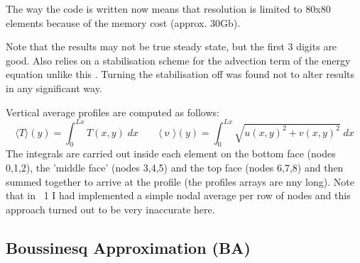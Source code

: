 The way the code is written now means that resolution is limited to 80x80 elements 
because of the memory cost (approx. 30Gb).

Note that the \aspect results may not be true steady state, but the first 3 digits are good.
Also \aspect relies on a stabilisation scheme for the advection term of the energy equation
unlike this \stone. Turning the stabilisation off was found not to alter results in any 
significant way.

Vertical average profiles are computed as follows:
\[
\langle T \rangle (y) = \int_0^{Lx} T(x,y) \; dx 
\qquad
\langle \upnu \rangle (y) = \int_0^{Lx} \sqrt{u(x,y)^2+v(x,y)^2} \; dx 
\]
The integrals are carried out inside each element on the bottom face (nodes 0,1,2),
the 'middle face' (nodes 3,4,5) and the top face (nodes 6,7,8) and then summed together
to arrive at the profile (the profiles arrays are nny long). 
Note that in \stone~1 I had implemented a simple nodal average
per row of nodes and this approach turned out to be very inaccurate here.   

\newpage
\subsection*{Boussinesq Approximation (BA)}

